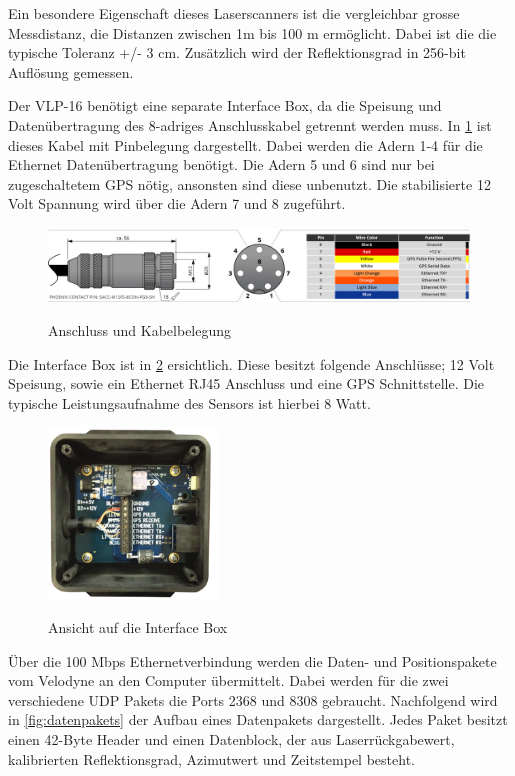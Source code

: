 Ein besondere Eigenschaft dieses Laserscanners ist die vergleichbar grosse Messdistanz, die Distanzen  zwischen 1m bis 100 m ermöglicht. Dabei ist die die typische Toleranz +/- 3 cm. Zusätzlich wird der Reflektionsgrad in 256-bit Auflösung gemessen.    

Der VLP-16 benötigt eine separate Interface Box, da die Speisung und Datenübertragung des 8-adriges Anschlusskabel getrennt werden muss. In \ref{fig:CablePin} ist dieses Kabel mit Pinbelegung dargestellt. Dabei werden die Adern 1-4 für die Ethernet Datenübertragung benötigt. Die Adern 5 und 6 sind nur bei zugeschaltetem \ac{GPS} nötig, ansonsten sind diese unbenutzt. Die stabilisierte 12 Volt Spannung wird über die Adern 7 und 8 zugeführt.

\begin{figure}[H]
	\centering
	\includegraphics[width=1\textwidth]{resources/Cablepins.PNG}
	\caption[Anschluss und Kabelbelegung]{Anschluss und Kabelbelegung}\protect\cite{velodyne}
	\label{fig:CablePin}
\end{figure} 

Die Interface Box ist in \ref{fig:InterfaceBox} ersichtlich.  Diese besitzt folgende Anschlüsse; 12 Volt Speisung, sowie ein Ethernet RJ45 Anschluss und eine \ac{GPS} Schnittstelle. Die typische Leistungsaufnahme des Sensors ist hierbei 8 Watt.

\begin{figure}[H]
	\centering
	\includegraphics[width=0.4\textwidth]
	{resources/InterfaceBox.PNG}
	\caption[Ansicht auf die Interfacebox]{Ansicht auf die Interface Box} \protect\cite{velodyne}
	\label{fig:InterfaceBox}
\end{figure}

Über die 100 Mbps Ethernetverbindung werden die Daten- und Positionspakete vom Velodyne an den Computer übermittelt. Dabei werden für die zwei verschiedene \ac{UDP} Pakets die Ports 2368 und 8308 gebraucht. Nachfolgend wird in \ref{fig:datenpakets} der Aufbau eines Datenpakets dargestellt. Jedes Paket besitzt einen 42-Byte Header und einen Datenblock, der aus Laserrückgabewert, kalibrierten Reflektionsgrad, Azimutwert und Zeitstempel besteht.

